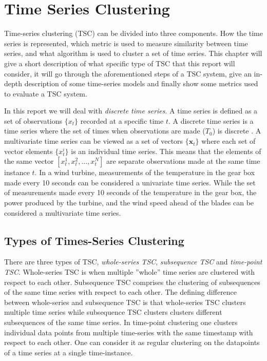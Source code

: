 \newpage
\chapter{Time Series Clustering}
Time-series clustering (TSC) can be divided into three components. How the time series is represented, which metric is used to measure similarity between time series, and what algorithm is used to cluster a set of time series. This chapter will give a short description of what specific type of TSC that this report will consider, it will go through the aforementioned steps of a TSC system, give an in-depth description of some time-series models and finally show some metrics used to evaluate a TSC system. 

In this report we will deal with \textit{discrete time series}. A time series is defined as a set of observations $\{x_t\}$ recorded at a specific time $t$. A discrete time series is a time series where the set of times when observations are made ($T_0$) is discrete \cite{brockwell_davis_advanced}. A multivariate time series can be viewed as a set of vectors $\{\mathbf{x}_t\}$ where each set of vector elements $\{x^i_t\}$ is an individual time series. This means that the elements of the same vector $[x^1_t, x^2_t,...,x^N_t]$ are separate observations made at the same time instance $t$. In a wind turbine, measurements of the temperature in the gear box made every 10 seconds can be considered a univariate time series. While the set of measurements made every 10 seconds of the temperature in the gear box, the power produced by the turbine, and the wind speed ahead of the blades can be considered a multivariate time series.

\section{Types of Times-Series Clustering}
There are three types of TSC, \textit{whole-series TSC}, \textit{subsequence TSC} and \textit{time-point TSC}. Whole-series TSC is when multiple ''whole'' time series are clustered with respect to each other. Subsequence TSC comprises the clustering of subsequences of the same time series with respect to each other. The defining difference between whole-series and subsequence TSC is that whole-series TSC clusters multiple time series while subsequence TSC clusters clusters different subsequences of the same time series. In time-point clustering one clusters individual data points from multiple time-series with the same timestamp with respect to each other. One can consider it as regular clustering on the datapoints of a time series at a single time-instance. 

